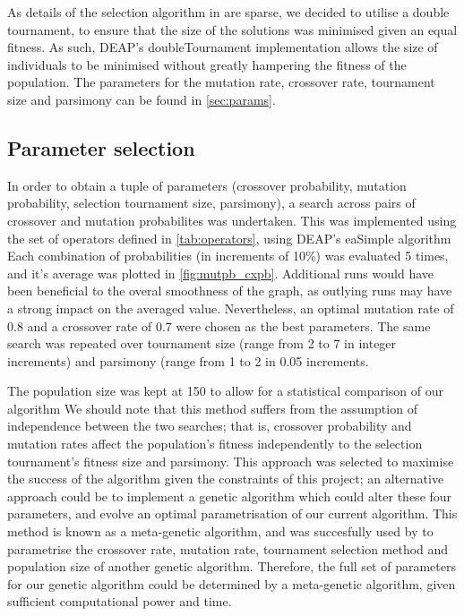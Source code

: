 \documentclass[british,10pt,a4paper]{article}
\begin{document}
As details of the selection algorithm in \cite{Ehlis2000-sz} are sparse, we decided to utilise a double tournament, to ensure that the size of the solutions was minimised given an equal fitness. As such, DEAP's doubleTournament implementation allows the size of individuals to be minimised without greatly hampering the fitness of the population. The parameters for the mutation rate, crossover rate, tournament size and parsimony can be found in \autoref{sec:params}.\newline

\subsection{Parameter selection}
\label{sec:params}
In order to obtain a tuple of parameters (crossover probability, mutation probability, selection tournament size, parsimony), a search across pairs of crossover and mutation probabilites was undertaken. This was implemented using the set of operators defined in \autoref{tab:operators}, using DEAP's eaSimple algorithm Each combination of probabilities (in increments of 10\%) was evaluated 5 times, and it's average was plotted in \autoref{fig:mutpb_cxpb}. Additional runs would have been beneficial to the overal smoothness of the graph, as outlying runs may have a strong impact on the averaged value. Nevertheless, an optimal mutation rate of 0.8 and a crossover rate of 0.7 were chosen as the best parameters. The same search was repeated over tournament size (range from 2 to 7 in integer increments) and parsimony (range from 1 to 2 in 0.05 increments. \newline

The population size was kept at 150 to allow for a statistical comparison of our algorithm 
We should note that this method suffers from the assumption of independence between the two searches; that is, crossover probability and mutation rates affect the population's fitness independently to the selection tournament's fitness size and parsimony. This approach was selected to maximise the success of the algorithm given the constraints of this project; an alternative approach could be to implement a genetic algorithm which could alter these four parameters, and evolve an optimal parametrisation of our current algorithm. This method is known as a meta-genetic algorithm, and was succesfully used by \citet{Brain2011-pz} to parametrise the crossover rate, mutation rate, tournament selection method and population size of another genetic algorithm. Therefore, the full set of parameters for our genetic algorithm could be determined by a meta-genetic algorithm, given sufficient computational power and time.\newline
\end{document}
